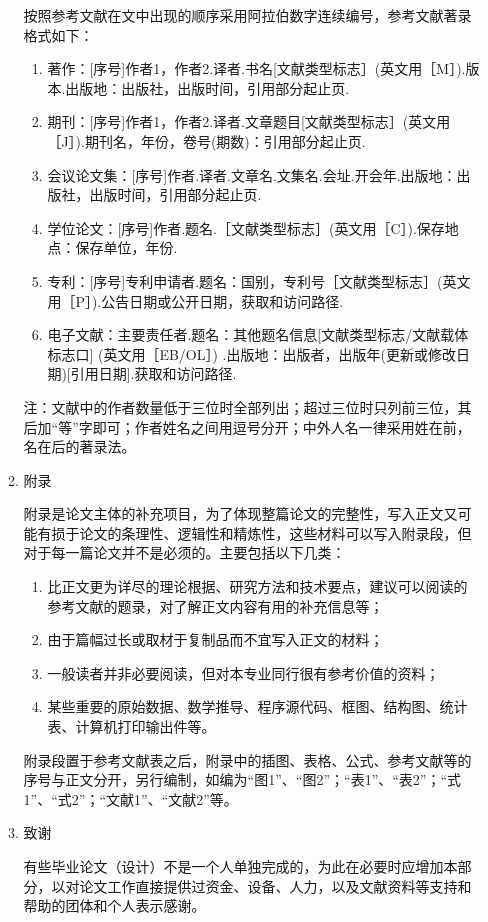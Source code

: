 \begin{itemize}[font=\cusong]
\begin{enumerate}[label=\bfseries\arabic*.]
按照参考文献在文中出现的顺序采用阿拉伯数字连续编号，参考文献著录格式如下：
\begin{enumerate}[label=(\arabic* )]%
\item 著作：[序号]作者1，作者2.译者.书名[文献类型标志］(英文用［M］).版本.出版地：出版社，出版时间，引用部分起止页.
\item 期刊：[序号]作者1，作者2.译者.文章题目[文献类型标志］(英文用［J］).期刊名，年份，卷号(期数)：引用部分起止页.
\item 会议论文集：[序号]作者.译者.文章名.文集名.会址.开会年.出版地：出版社，出版时间，引用部分起止页.
\item 学位论文：[序号]作者.题名.［文献类型标志］(英文用［C］).保存地点：保存单位，年份.
\item 专利：[序号]专利申请者.题名：国别，专利号［文献类型标志］(英文用［P］).公告日期或公开日期，获取和访问路径.
\item 电子文献：主要责任者.题名：其他题名信息[文献类型标志/文献载体标志口] (英文用［EB/OL］) .出版地：出版者，出版年(更新或修改日期)[引用日期].获取和访问路径.
\end{enumerate} 
注：文献中的作者数量低于三位时全部列出；超过三位时只列前三位，其后加“等”字即可；作者姓名之间用逗号分开；中外人名一律采用姓在前，名在后的著录法。　  

\item {\cusong  附录}\par
     附录是论文主体的补充项目，为了体现整篇论文的完整性，写入正文又可能有损于论文的条理性、逻辑性和精炼性，这些材料可以写入附录段，但对于每一篇论文并不是必须的。主要包括以下几类：
\begin{enumerate}[label=(\arabic* )]
\item 比正文更为详尽的理论根据、研究方法和技术要点，建议可以阅读的参考文献的题录，对了解正文内容有用的补充信息等；
\item 由于篇幅过长或取材于复制品而不宜写入正文的材料；
\item 一般读者并非必要阅读，但对本专业同行很有参考价值的资料；
\item 某些重要的原始数据、数学推导、程序源代码、框图、结构图、统计表、计算机打印输出件等。
\end{enumerate}\par
附录段置于参考文献表之后，附录中的插图、表格、公式、参考文献等的序号与正文分开，另行编制，如编为“图1”、“图2”；“表1”、“表2”；“式1”、“式2”；“文献1”、“文献2”等。
\item {\cusong 致谢}\par
      有些毕业论文（设计）不是一个人单独完成的，为此在必要时应增加本部分，以对论文工作直接提供过资金、设备、人力，以及文献资料等支持和帮助的团体和个人表示感谢。
\end{enumerate}
\end{itemize}

